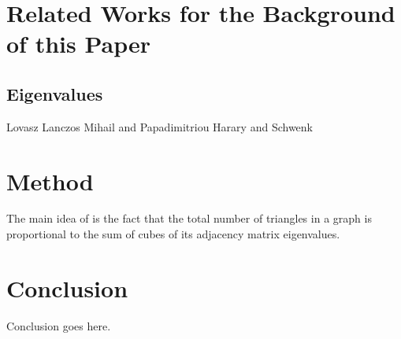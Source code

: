 \documentclass{acm_proc_article-sp}
\begin{document}
\section{Related Works for the Background of this Paper}

\subsection{Eigenvalues}
Lovasz
Lanczos
Mihail and Papadimitriou
Harary and Schwenk

\section{Method}
The main idea of \cite{original} is the fact that the total number of triangles
in a graph is proportional to the sum of cubes of its adjacency matrix
eigenvalues.

\section{Conclusion}
Conclusion goes here.

%

%
%
\end{document}
